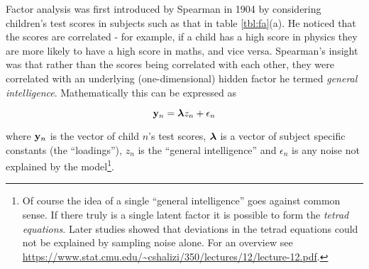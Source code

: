 \begin{table}
  \centering
{}
\hspace{5pt}
\caption{Children's test scores across subjects are correlated due to latent factors (a) in a similar 
way to the gene expression of key markers during differentiation (b).} \label{tbl:fa}
\end{table}

Factor analysis was first introduced by Spearman in 1904 \cite{spearman1904general} by considering children's test scores in subjects such as that in table \ref{tbl:fa}(a). He noticed that the scores are correlated - for example, if a child has a high score in physics they are more likely to have a high score in maths, and vice versa. Spearman's insight was that rather than the scores being correlated with each other, they were correlated with an underlying (one-dimensional) hidden factor he termed \emph{general intelligence}. Mathematically this can be expressed as

\begin{equation}
\mathbf{y}_n = \bm{\lambda} z_n + \epsilon_n
\end{equation}

where $\mathbf{y}_n$ is the vector of child $n$'s test scores, $\bm{\lambda}$ is a vector of subject specific constants (the ``loadings''), $z_n$ is the ``general intelligence'' and $\epsilon_n$ is any noise not explained by the model\footnote{
Of course the idea of a single ``general intelligence'' goes against common sense. If there truly is a single latent factor it is possible to form the \emph{tetrad equations}. Later studies showed that deviations in the tetrad equations could not be explained by sampling noise alone. For an overview see \url{https://www.stat.cmu.edu/~cshalizi/350/lectures/12/lecture-12.pdf}.
}.

